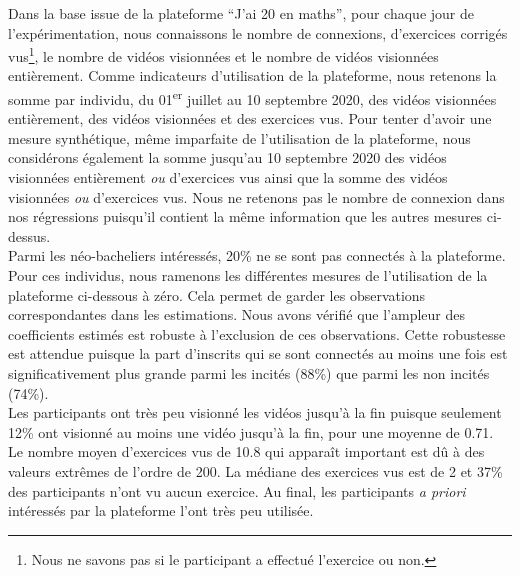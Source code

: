 \documentclass[
]{book}
\begin{document}
\quad Dans la base issue de la plateforme ``J'ai 20 en maths'', pour chaque jour de l'expérimentation, nous connaissons le nombre de connexions, d'exercices corrigés vus\footnote{Nous ne savons pas si le participant a effectué l'exercice ou non.}, le nombre de vidéos visionnées et le nombre de vidéos visionnées entièrement. Comme indicateurs d'utilisation de la plateforme, nous retenons la somme par individu, du 01\textsuperscript{er} juillet au 10 septembre 2020, des vidéos visionnées entièrement, des vidéos visionnées et des exercices vus. Pour tenter d'avoir une mesure synthétique, même imparfaite de l'utilisation de la plateforme, nous considérons également la somme jusqu'au 10 septembre 2020 des vidéos visionnées entièrement \emph{ou} d'exercices vus ainsi que la somme des vidéos visionnées \emph{ou} d'exercices vus. Nous ne retenons pas le nombre de connexion dans nos régressions puisqu'il contient la même information que les autres mesures ci-dessus.\\
Parmi les néo-bacheliers intéressés, 20\% ne se sont pas connectés à la plateforme. Pour ces individus, nous ramenons les différentes mesures de l'utilisation de la plateforme ci-dessous à zéro. Cela permet de garder les observations correspondantes dans les estimations. Nous avons vérifié que l'ampleur des coefficients estimés est robuste à l'exclusion de ces observations. Cette robustesse est attendue puisque la part d'inscrits qui se sont connectés au moins une fois est significativement plus grande parmi les incités (88\%) que parmi les non incités (74\%).\\
Les participants ont très peu visionné les vidéos jusqu'à la fin puisque seulement 12\% ont visionné au moins une vidéo jusqu'à la fin, pour une moyenne de 0.71. Le nombre moyen d'exercices vus de 10.8 qui apparaît important est dû à des valeurs extrêmes de l'ordre de 200. La médiane des exercices vus est de 2 et 37\% des participants n'ont vu aucun exercice.
Au final, les participants \emph{a priori} intéressés par la plateforme l'ont très peu utilisée.
\end{document}

